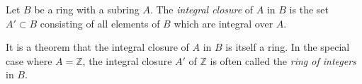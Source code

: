 \documentclass{article}
\begin{document}
Let $B$ be a ring with a subring $A$. The {\em integral closure} of $A$ in $B$ is the set $A' \subset B$ consisting of all elements of $B$ which are integral over $A$.

It is a theorem that the integral closure of $A$ in $B$ is itself a ring. In the special case where $A = \mathbb{Z}$, the integral closure $A'$ of $\mathbb{Z}$ is often called the {\em ring of integers} in $B$.
\end{document}
